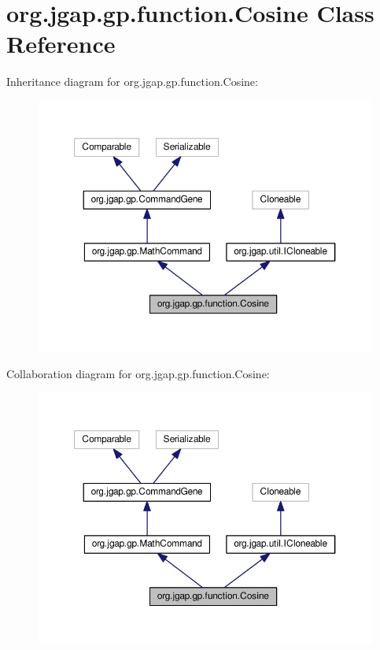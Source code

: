 \hypertarget{classorg_1_1jgap_1_1gp_1_1function_1_1_cosine}{\section{org.\-jgap.\-gp.\-function.\-Cosine Class Reference}
\label{classorg_1_1jgap_1_1gp_1_1function_1_1_cosine}
}


Inheritance diagram for org.\-jgap.\-gp.\-function.\-Cosine\-:
\nopagebreak
\begin{figure}[H]
\begin{center}
\leavevmode
\includegraphics[width=350pt]{classorg_1_1jgap_1_1gp_1_1function_1_1_cosine__inherit__graph}
\end{center}
\end{figure}


Collaboration diagram for org.\-jgap.\-gp.\-function.\-Cosine\-:
\nopagebreak
\begin{figure}[H]
\begin{center}
\leavevmode
\includegraphics[width=350pt]{classorg_1_1jgap_1_1gp_1_1function_1_1_cosine__coll__graph}
\end{center}
\end{figure}
